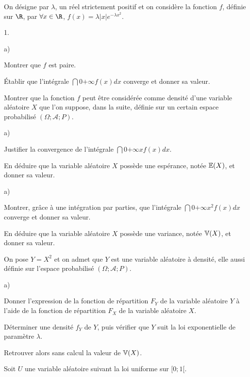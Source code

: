 \documentclass[11pt]{article}%
\begin{document}
On désigne par $\lambda$, un réel strictement positif et on considère
la fonction $f$, définie sur $\R$, par $\forall x\in\R$,
$f\left(x\right) = \lambda\left|x\right|e^{-\lambda x^{2}}$.
\begin{noliste}{1.}
 \setlength{\itemsep}{4mm}
\item {}

\begin{noliste}{a)}
 \setlength{\itemsep}{2mm}
\item Montrer que $f$ est paire. 
\item Établir que l'intégrale ${ \dint{0}{+ \infty}f\left(x\right)dx}$
converge et donner sa valeur. 
\item Montrer que la fonction $f$ peut être considérée comme densité
d'une
variable aléatoire $X$ que l'on suppose, dans la suite, définie sur
un certain espace probabilisé $\left(\Omega;\mathcal{A};P\right)$. 
\end{noliste}
\item {}

\begin{noliste}{a)}
 \setlength{\itemsep}{2mm}
\item Justifier la convergence de l'intégrale ${ \dint{0}{+
\infty}xf\left(x\right)dx}$. 
\item En déduire que la variable aléatoire $X$ possède une espérance,
notée
$\mathbb{E}(X)$, et donner sa valeur. 
\end{noliste}
\item {}

\begin{noliste}{a)}
 \setlength{\itemsep}{2mm}
\item Montrer, grâce à une intégration par parties, que l'intégrale ${
\dint{0}{+ \infty}x^{2}f\left(x\right)dx}$
converge et donner sa valeur.
\item En déduire que la variable aléatoire $X$ possède une variance,
notée
$\mathbb{V}(X)$, et donner sa valeur. 
\end{noliste}
\item On pose $Y = X^{2}$ et on admet que $Y$ est une variable
aléatoire
à densité, elle aussi définie sur l'espace probabilisé
$\left(\Omega;\mathcal{A};P\right)$. 

\begin{noliste}{a)}
 \setlength{\itemsep}{2mm}
\item Donner l'expression de la fonction de répartition $F_{Y}$ de la
variable
aléatoire $Y$ à l'aide de la fonction de répartition $F_{X}$ de
la variable aléatoire $X$.
\item Déterminer une densité $f_{Y}$ de $Y$, puis vérifier que $Y$ suit
la loi exponentielle de paramètre $\lambda$.
\item Retrouver alors sans calcul la valeur de $\mathbb{V}(X)$. 
\end{noliste}
\item Soit $U$ une variable aléatoire suivant la loi uniforme sur
$[0;1[$. 


\end{noliste}
\end{document}
